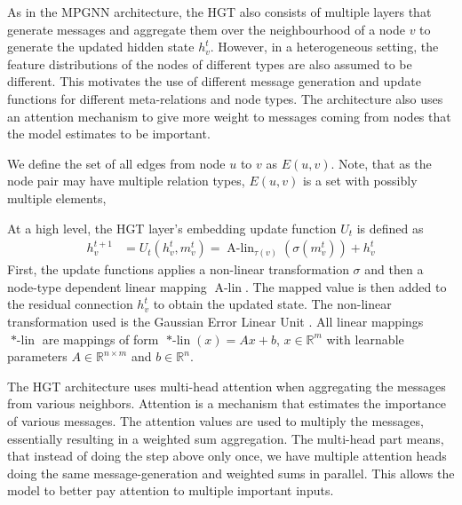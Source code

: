 \documentclass[english, 12pt, a4paper, sci, utf8, a-2b, online]{aaltothesis}
\newcommand{\R}{\mathbb{R}}
\newcommand{\Alin}{\operatorname{A-lin}}
\newcommand{\msg}{\operatorname{Msg}}
\newcommand{\att}{\operatorname{Att}}
\newcommand{\agg}{\operatorname{Aggregate}}
\begin{document}

As in the MPGNN architecture, the HGT also consists of multiple layers that generate messages and aggregate them over the neighbourhood of a node $v$ to generate the updated hidden state $h_v^t$. However, in a heterogeneous setting, the feature distributions of the nodes of different types are also assumed to be different. This motivates the use of different message generation and update functions for different meta-relations and node types. The architecture also uses an attention mechanism to give more weight to messages coming from nodes that the model estimates to be important.

We define the set of all edges from node $u$ to $v$ as $E(u, v)$. Note, that as the node pair may have multiple relation types, $E(u,v)$ is a set with possibly multiple elements,

At a high level, the HGT layer's embedding update function $U_t$ is defined as
\begin{align}
    h^{t+1}_v &= U_t(h_v^t, m_v^t) = \Alin_{\tau(v)}(\sigma(m_v^t))+h_v^t
\end{align}
First, the update functions applies a non-linear transformation $\sigma$ and then a node-type dependent linear mapping $\Alin$. The mapped value is then added to the residual connection $h_v^t$ to obtain the updated state. The non-linear transformation used is the Gaussian Error Linear Unit \cite{gelus}. All linear mappings $\operatorname{*-lin}$ are mappings of form $\operatorname{*-lin}(x) = Ax + b$, $x \in \R^m$ with learnable parameters $A \in \R^{n\times m}$ and $b \in \R^n$.

The HGT architecture uses multi-head attention when aggregating the messages from various neighbors. Attention is a mechanism that estimates the importance of various messages. The attention values are used to multiply the messages, essentially resulting in a weighted sum aggregation. The multi-head part means, that instead of doing the step above only once, we have multiple attention heads doing the same message-generation and weighted sums in parallel. This allows the model to better pay attention to multiple important inputs.
\end{document}
